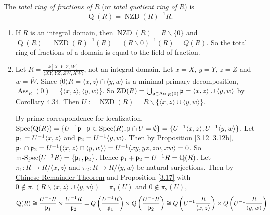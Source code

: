 \begin{definition}\label{3.20}
    The \emph{total ring of fractions of} $R$ (or \emph{total quotient ring of }$R$) is 
    \[\operatorname{Q}(R) = \operatorname{NZD}(R)^{-1}R.\]
\end{definition}

\begin{example*}
    \begin{enumerate}
        \item If $R$ is an integral domain, then $\operatorname{NZD}(R) = R \smallsetminus \{0\}$ and $\operatorname{Q}(R) = \operatorname{NZD}(R)^{-1}(R) = (R \smallsetminus 0)^{-1}(R) = Q(R)$. So the total ring of fractions of a domain is equal to the field of fraction. 
        \item Let $R = \frac{k[X,Y,Z,W]}{\langle XY,YZ,ZW,XW \rangle}$, not an integral domain. 
            Let $x= \overbar{X}$, $y = \overbar{Y}$, $z = \overbar{Z}$ and $w = \overbar{W}$. Since $\langle 0 \rangle R = \langle x,z \rangle \cap \langle y,w \rangle$ is a minimal primary decomposition, $\operatorname{Ass}_R(0) = \{\langle x,z \rangle, \langle y, w \rangle\}$. So $\operatorname{ZD}(R) = \bigcup_{\mathfrak{p} \in \operatorname{Ass}_R(0)}\mathfrak{p} = \langle x, z\rangle \cup \langle y,w \rangle$ by Corollary 4.34. Then $U := \operatorname{NZD}(R) = R \smallsetminus \{\langle x, z \rangle \cup \langle y, w\rangle\}$. \par 
            By prime correspondence for localization, $\operatorname{Spec}(\operatorname{Q}(R)) = \{U^{-1}\mathfrak{p} \mid \mathfrak{p} \in \operatorname{Spec}(R), \mathfrak{p} \cap U = \emptyset\} = \{U^{-1}\langle x,z \rangle, U^{-1}\langle y,w \rangle\}$. Let $\mathfrak{p}_1 = U^{-1}\langle x,z \rangle$ and $\mathfrak{p}_2 = U^{-1} \langle y,w \rangle$. Then by Proposition \ref{3.12}\ref{3.12b}, $\mathfrak{p}_1 \cap \mathfrak{p}_2 = U^{-1}(\langle x,z \rangle \cap \langle y,w \rangle) = U^{-1} \langle xy,yz,zw,xw \rangle = 0$. So $\operatorname{m-Spec}(U^{-1}R) = \{\mathfrak{p}_1,\mathfrak{p}_2\}$. Hence $\mathfrak{p}_1 + \mathfrak{p}_2 = U^{-1}R = \operatorname{Q}(R)$. Let $\pi_1: R \to R/\langle x, z \rangle$ and $\pi_2: R \to R/\langle y, w \rangle$ be natural surjections. Then by \hyperref[1.46]{Chinese Remainder Theorem} and Proposition \ref{3.17} with $0 \not \in \pi_1(R \smallsetminus \langle x, z \rangle \cup \langle y,w \rangle) = \pi_1(U)$ and $0 \not \in \pi_2(U)$,
            \begin{align*}
                \operatorname{Q}(R) & \cong \frac{U^{-1}R}{\ffp_1} \times \frac{U^{-1}R}{\ffp_2} = Q\left(\frac{U^{-1}R}{\ffp_1}\right) \times Q\left(\frac{U^{-1}R}{\ffp_2}\right) \cong Q\left(U^{-1}\frac{R}{\langle x,z \rangle}\right) \times Q\left(U^{-1}\frac{R}{\langle y,w \rangle}\right) \\

\end{align*}
\end{enumerate}
\end{example*}
